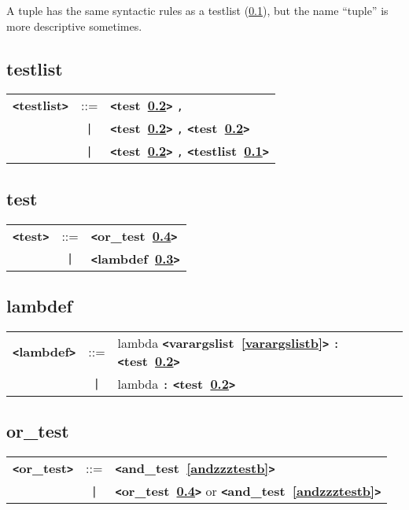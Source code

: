 \documentclass[12pt]{article}
\begin{document}
A tuple has the same syntactic rules as a testlist (\ref{testlistb}), but the name ``tuple'' is more descriptive sometimes.

\subsection{testlist}
\label{testlistb}
\begin{tabular}{lcl}
{\bf \verb+<+testlist\verb+>+} & ::=  & {\bf \verb+<+test~\ref{testb}\verb+>+}  \verb|,| \\
 & \verb+|+  & {\bf \verb+<+test~\ref{testb}\verb+>+}  \verb|,| {\bf \verb+<+test~\ref{testb}\verb+>+}  \\
 & \verb+|+  & {\bf \verb+<+test~\ref{testb}\verb+>+}  \verb|,| {\bf \verb+<+testlist~\ref{testlistb}\verb+>+}  \\
\end{tabular}

\subsection{test}
\label{testb}

\begin{tabular}{lcl}
{\bf \verb+<+test\verb+>+} & ::=  & {\bf \verb+<+or\_test~\ref{orzzztestb}\verb+>+}  \\
 & \verb+|+  & {\bf \verb+<+lambdef~\ref{lambdefb}\verb+>+}  \\
\end{tabular}

\subsection{lambdef}
\label{lambdefb}
\begin{tabular}{lcl}
{\bf \verb+<+lambdef\verb+>+} & ::=  & lambda {\bf \verb+<+varargslist~\ref{varargslistb}\verb+>+}  \verb|:| {\bf \verb+<+test~\ref{testb}\verb+>+}  \\
 & \verb+|+  & lambda \verb|:| {\bf \verb+<+test~\ref{testb}\verb+>+}  \\
\end{tabular}

\subsection{or\_test}
\label{orzzztestb}
\begin{tabular}{lcl}
{\bf \verb+<+or\_test\verb+>+} & ::=  & {\bf \verb+<+and\_test~\ref{andzzztestb}\verb+>+}  \\
 & \verb+|+  & {\bf \verb+<+or\_test~\ref{orzzztestb}\verb+>+}  or {\bf \verb+<+and\_test~\ref{andzzztestb}\verb+>+}  \\
\end{tabular}
\end{document}
